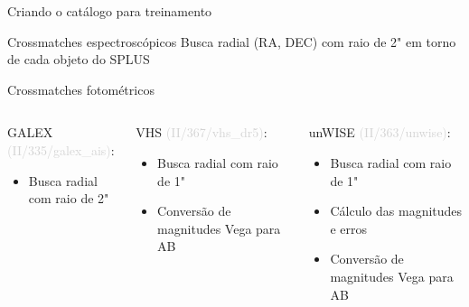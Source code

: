 \begin{frame}[c]{Criando o catálogo para treinamento}
    \begin{splusbox}{Crossmatches espectroscópicos}
        \small
        Busca radial (RA, DEC) com raio de 2" em torno de cada objeto do SPLUS
    \end{splusbox}
    \begin{splusbox}{Crossmatches fotométricos}
        \small
        \begin{columns}[t]
            \begin{column}{0.29\textwidth}
               GALEX \textcolor{LightGray}{(II/335/galex\_ais)}:
               \begin{itemize}
                    \item Busca radial com raio de 2"
                \end{itemize}
            \end{column}
            \begin{column}{0.29\textwidth}
                VHS \textcolor{LightGray}{(II/367/vhs\_dr5)}:
                \begin{itemize}
                    \justifying
                    \item Busca radial com raio de 1"
                    \item Conversão de magnitudes Vega para AB
                \end{itemize}
            \end{column}
            \begin{column}{0.29\textwidth}
                unWISE \textcolor{LightGray}{(II/363/unwise)}:
                \begin{itemize}
                    \justifying
                    \item Busca radial com raio de 1"
                    \item Cálculo das magnitudes e erros
                    \item Conversão de magnitudes Vega para AB
                \end{itemize}
            \end{column}
        \end{columns}
    \end{splusbox}
\end{frame}


